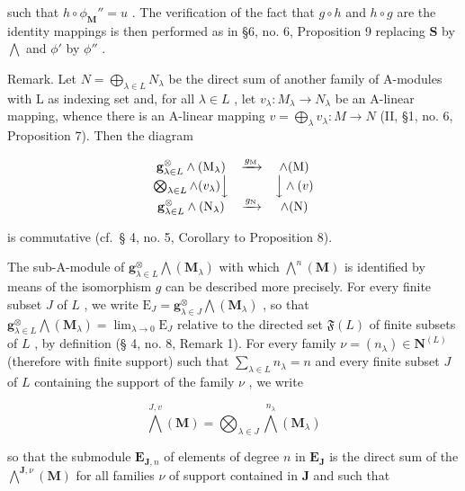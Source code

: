 such that \(h \circ \phi_{\mathbf{M}}'' = u\) . The verification of the fact that \(g \circ h\) and \(h \circ g\) are the identity mappings is then performed as in §6, no. 6, Proposition 9 replacing \(\mathbf{S}\) by \(\bigwedge\) and \(\phi'\) by \(\phi''\) .

Remark. Let \(N = \bigoplus_{\lambda \in L} N_{\lambda}\) be the direct sum of another family of A-modules with L as indexing set and, for all \(\lambda \in L\) , let \(v_{\lambda}: M_{\lambda} \to N_{\lambda}\) be an A-linear mapping, whence there is an A-linear mapping \(v = \bigoplus_{\lambda} v_{\lambda}: M \to N\) (II, §1, no. 6, Proposition 7). Then the diagram

\[
\begin{array}{c c c} \mathbf {g} _ {\lambda \in L} ^ {\otimes} \wedge (\mathrm{M} _ {\lambda}) & \xrightarrow {g _ {\mathrm{M}}} & \wedge (\mathrm{M}) \\ \bigotimes_ {\lambda \in L} \wedge (v _ {\lambda}) \Big \downarrow & & \Big \downarrow \wedge (v) \\ \mathbf {g} _ {\lambda \in L} ^ {\otimes} \wedge (\mathrm{N} _ {\lambda}) & \xrightarrow {g _ {\mathrm{N}}} & \wedge (\mathrm{N}) \end{array}
\]

is commutative (cf.~§ 4, no. 5, Corollary to Proposition 8).

The sub-A-module of \(\mathbf{g}_{\lambda \in L}^{\otimes} \bigwedge (\mathbf{M}_{\lambda})\) with which \(\bigwedge^{n}(\mathbf{M})\) is identified by means of the isomorphism \(g\) can be described more precisely. For every finite subset \(J\) of \(L\) , we write \(\mathrm{E}_{J} = \mathbf{g}_{\lambda \in J}^{\otimes} \bigwedge (\mathbf{M}_{\lambda})\) , so that \(\mathbf{g}_{\lambda \in L}^{\otimes} \bigwedge (\mathbf{M}_{\lambda}) = \lim_{\lambda \to 0} \mathrm{E}_{J}\) relative to the directed set \(\mathfrak{F}(L)\) of finite subsets of \(L\) , by definition (§ 4, no. 8, Remark 1). For every family \(\nu = (n_{\lambda}) \in \mathbf{N}^{(L)}\) (therefore with finite support) such that \(\sum_{\lambda \in L} n_{\lambda} = n\) and every finite subset \(J\) of \(L\) containing the support of the family \(\nu\) , we write

\[
\bigwedge^ {J, v} (\mathbf {M}) = \bigotimes_ {\lambda \in J} \bigwedge^ {n _ {\lambda}} (\mathbf {M} _ {\lambda})\tag{16}
\]

so that the submodule \(\mathbf{E}_{\mathbf{J},n}\) of elements of degree \(n\) in \(\mathbf{E}_{\mathbf{J}}\) is the direct sum of the \(\bigwedge^{\mathbf{J},\nu}(\mathbf{M})\) for all families \(\nu\) of support contained in \(\mathbf{J}\) and such that

